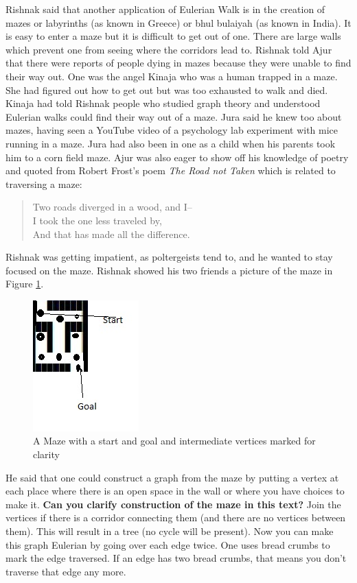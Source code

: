 Rishnak said that another application of Eulerian Walk is in the creation of mazes or labyrinths (as known in Greece) or bhul bulaiyah (as known in India).  It is easy to enter a maze but it is difficult to get out of one. There are large walls which prevent one from seeing where the corridors lead to. Rishnak told Ajur that there were reports of people dying in mazes because they were unable to find their way out. One was the angel Kinaja who was a human trapped in a maze. She had figured out how to get out but was too exhausted to walk and died. Kinaja had told Rishnak people who studied graph theory and understood Eulerian walks could find their way out of a maze. Jura said he knew too about mazes, having seen a YouTube video of a psychology lab experiment with mice running in a maze. Jura had also been in one as a child when his parents took him to a corn field maze. Ajur was also eager to show off his knowledge of poetry and quoted from Robert Frost's poem \emph{The Road not Taken} which is related to traversing a maze: \begin{quotation}\noindent Two roads diverged in a wood, and I--\\ 
I took the one less traveled by,\\ And that has made all the difference.
\end{quotation}

\noindent Rishnak was getting impatient, as poltergeists tend to, and he wanted to stay focused on the maze. Rishnak showed his two friends a picture of the maze in Figure \ref{4g7}.
\begin{figure}
\begin{center}
\includegraphics{maze11.jpg}
\caption{A Maze with a start and goal and intermediate vertices marked for clarity}\label{4g7}
\end{center}
\end{figure}

He said that one could construct a graph from the maze by putting a vertex at each place where there is an open space in the wall or where you have choices to make it. \textbf{Can you clarify construction of the maze in this text?} Join the vertices if there is a corridor connecting them (and there are no vertices between them). This will result in a tree (no cycle will be present). Now you can make this graph Eulerian by going over each edge twice. One uses bread crumbs to mark the edge traversed. If an edge has two bread crumbs, that means you don't traverse that edge any more.

